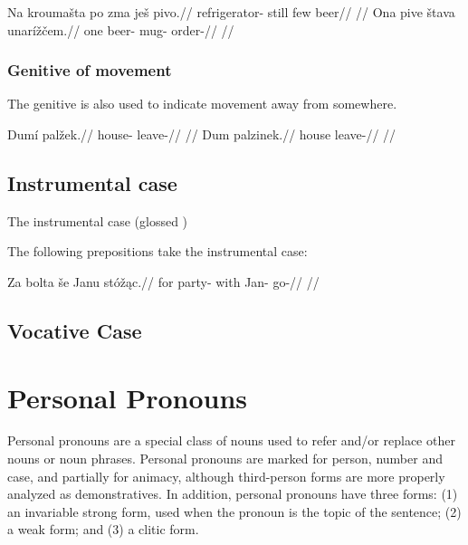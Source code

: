 \pex
\a
\begingl
\gla Na kroumašta po zma ješ pivo.//
\glb {} refrigerator- still few  beer//
\glft {}//
\endgl
\a
\begingl
\gla Ona pive štava unarížčem.//
\glb one beer- mug- order-//
\glft {}//
\endgl
\xe

\subsubsection{Genitive of movement}

The genitive is also used to indicate movement away from somewhere.

\pex
\a
\begingl
\gla Dumí palžek.//
\glb house- leave-//
\glft {}//
\endgl
\a
\begingl
\gla Dum palzinek.//
\glb house leave-//
\glft {}//
\endgl
\xe

\subsection{Instrumental case}

The instrumental case (glossed )

The following prepositions take the instrumental case:  

\pex
\begingl
\gla Za bolta še Janu stóž\k{a}c.//
\glb for party- with Jan- go-//
\glft {}//
\endgl
\xe


\subsection{Vocative Case}



\section{Personal Pronouns}

Personal pronouns are a special class of nouns used to refer and/or replace other nouns or noun phrases. Personal pronouns are marked for person, number and case, and partially for animacy, although third-person forms are more properly analyzed as demonstratives. In addition, personal pronouns have three forms: (1) an invariable strong form, used when the pronoun is the topic of the sentence; (2) a weak form; and (3) a clitic form.

